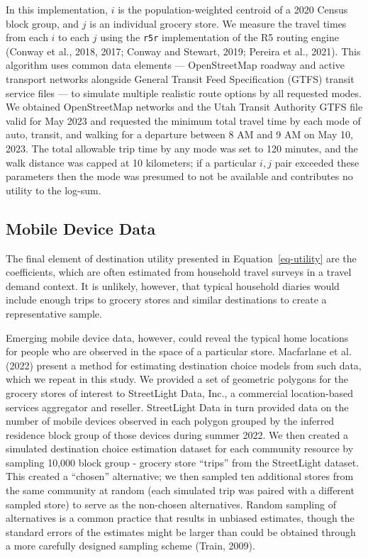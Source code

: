 \documentclass[
  letterpaper,
  DIV=11,
  numbers=noendperiod]{scrreport}
\begin{document}
In this implementation, \(i\) is the population-weighted centroid of a
2020 Census block group, and \(j\) is an individual grocery store. We
measure the travel times from each \(i\) to each \(j\) using the
\texttt{r5r} implementation of the R5 routing engine (Conway et al.,
2018, 2017; Conway and Stewart, 2019; Pereira et al., 2021). This
algorithm uses common data elements --- OpenStreetMap roadway and active
transport networks alongside General Transit Feed Specification (GTFS)
transit service files --- to simulate multiple realistic route options
by all requested modes. We obtained OpenStreetMap networks and the Utah
Transit Authority GTFS file valid for May 2023 and requested the minimum
total travel time by each mode of auto, transit, and walking for a
departure between 8 AM and 9 AM on May 10, 2023. The total allowable
trip time by any mode was set to 120 minutes, and the walk distance was
capped at 10 kilometers; if a particular \(i,j\) pair exceeded these
parameters then the mode was presumed to not be available and
contributes no utility to the log-sum.

\hypertarget{mobile-device-data}{%
\subsection{Mobile Device Data}\label{mobile-device-data}}

The final element of destination utility presented in
Equation~\ref{eq-utility} are the coefficients, which are often
estimated from household travel surveys in a travel demand context. It
is unlikely, however, that typical household diaries would include
enough trips to grocery stores and similar destinations to create a
representative sample.

Emerging mobile device data, however, could reveal the typical home
locations for people who are observed in the space of a particular
store. Macfarlane et al. (2022) present a method for estimating
destination choice models from such data, which we repeat in this study.
We provided a set of geometric polygons for the grocery stores of
interest to StreetLight Data, Inc., a commercial location-based services
aggregator and reseller. StreetLight Data in turn provided data on the
number of mobile devices observed in each polygon grouped by the
inferred residence block group of those devices during summer 2022. We
then created a simulated destination choice estimation dataset for each
community resource by sampling 10,000 block group - grocery store
``trips'' from the StreetLight dataset. This created a ``chosen''
alternative; we then sampled ten additional stores from the same
community at random (each simulated trip was paired with a different
sampled store) to serve as the non-chosen alternatives. Random sampling
of alternatives is a common practice that results in unbiased estimates,
though the standard errors of the estimates might be larger than could
be obtained through a more carefully designed sampling scheme (Train,
2009).
\end{document}

